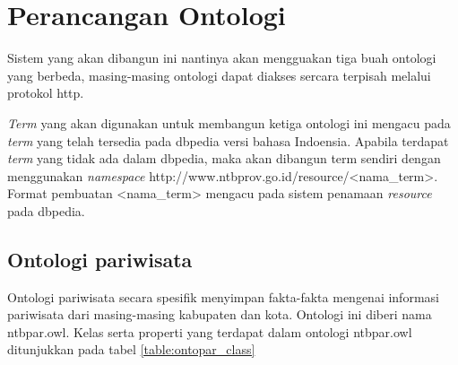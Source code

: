 \section{Perancangan Ontologi}
Sistem yang akan dibangun ini nantinya akan mengguakan tiga buah ontologi yang berbeda, masing-masing ontologi dapat diakses sercara terpisah melalui protokol http.

\emph{Term} yang akan digunakan untuk membangun ketiga ontologi ini mengacu pada \emph{term} yang telah tersedia pada dbpedia versi bahasa Indoensia. Apabila terdapat \emph{term} yang tidak ada dalam dbpedia, maka akan dibangun term sendiri dengan menggunakan \emph{namespace} http://www.ntbprov.go.id/resource/<nama\_term>. Format pembuatan <nama\_term> mengacu pada sistem penamaan \emph{resource} pada dbpedia.

\subsection{Ontologi pariwisata}
Ontologi pariwisata secara spesifik menyimpan fakta-fakta mengenai informasi pariwisata dari masing-masing kabupaten dan kota. Ontologi ini diberi nama ntbpar.owl. Kelas serta properti yang terdapat dalam ontologi ntbpar.owl ditunjukkan pada tabel \ref{table:ontopar_class}

